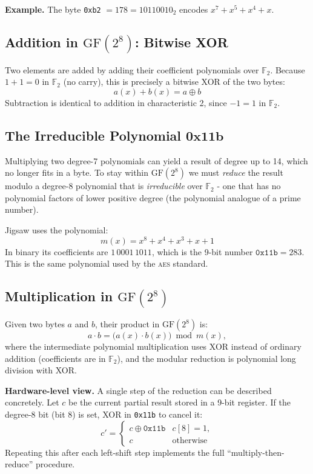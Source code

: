 \documentclass[12pt]{article}
\theoremstyle{definition}
\theoremstyle{plain}
\begin{document}
	\textbf{Example.}  The byte \texttt{0xb2} $= 178 = 10110010_2$ encodes
	$x^7 + x^5 + x^4 + x$.
	
	\subsection{Addition in $\mathrm{GF}(2^8)$: Bitwise XOR}
	
	Two elements are added by adding their coefficient polynomials over
	$\mathbb{F}_2$.  Because $1 + 1 = 0$ in $\mathbb{F}_2$ (no carry), this is
	precisely a bitwise XOR of the two bytes:
	$$ a(x) + b(x) = a \oplus b $$
	Subtraction is identical to addition in characteristic 2, since $-1 = 1$
	in $\mathbb{F}_2$.
	
	\subsection{The Irreducible Polynomial $\mathbf{0x11b}$}
	
	Multiplying two degree-7 polynomials can yield a result of degree up to 14,
	which no longer fits in a byte.  To stay within $\mathrm{GF}(2^8)$ we must
	\emph{reduce} the result modulo a degree-8 polynomial that is
	\emph{irreducible} over $\mathbb{F}_2$ - one that has no polynomial factors
	of lower positive degree (the polynomial analogue of a prime number).
	
	Jigsaw uses the polynomial:
	$$ m(x) = x^8 + x^4 + x^3 + x + 1 $$
	In binary its coefficients are $1\,0001\,1011$, which is the 9-bit number
	$\texttt{0x11b} = 283$.  This is the same polynomial used by the
	\textsc{aes} standard.
	
	\subsection{Multiplication in $\mathrm{GF}(2^8)$}
	
	Given two bytes $a$ and $b$, their product in $\mathrm{GF}(2^8)$ is:
	$$
	a \cdot b = \bigl(a(x)\cdot b(x)\bigr) \bmod m(x),
	$$
	where the intermediate polynomial multiplication uses XOR instead of
	ordinary addition (coefficients are in $\mathbb{F}_2$), and the modular
	reduction is polynomial long division with XOR.
	
	\textbf{Hardware-level view.}
	A single step of the reduction can be described concretely.  Let $c$ be the
	current partial result stored in a 9-bit register.  If the degree-8 bit
	(bit 8) is set, XOR in \texttt{0x11b} to cancel it:
	\begin{equation}
		c' = \begin{cases} c \oplus \texttt{0x11b} & c[8] = 1, \\ c & \text{otherwise} \end{cases}
		\label{eq:reduce}
	\end{equation}
	Repeating this after each left-shift step implements the full
	``multiply-then-reduce'' procedure.
	
\end{document}
